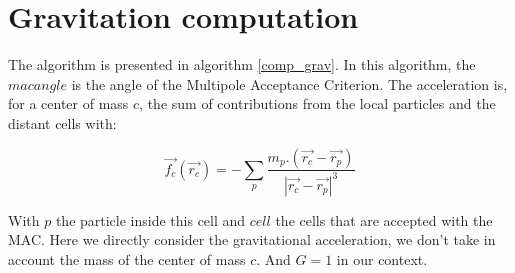 \documentclass{article}
\begin{document}

%
%


\section{Gravitation computation}

The algorithm is presented in algorithm \ref{comp_grav}.
In this algorithm, the $macangle$ is the angle of the Multipole Acceptance Criterion.
The acceleration is, for a center of mass $c$, the sum of contributions from the local particles and the distant cells with:

\begin{equation}
\vec{f_c}(\vec{r_c}) = -\sum_{p} \frac{m_p.(\vec{r_c}-\vec{r_p})}{|\vec{r_c}-\vec{r_p}|^3}
\end{equation}

With $p$ the particle inside this cell and $cell$ the cells that are accepted with the MAC.
Here we directly consider the gravitational acceleration, we don't take in account the mass of the center of mass $c$. And $G=1$ in our context.
\end{document}
